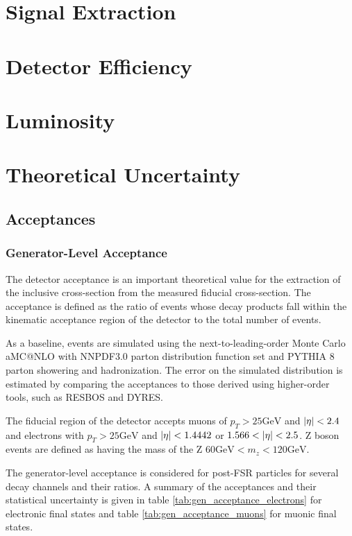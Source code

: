 \documentclass[aps,prd,final,twocolumn,letterpaper]{revtex4}
\begin{document}
	\section{Signal Extraction}
	\section{Detector Efficiency}
	\section{Luminosity}
	\section{Theoretical Uncertainty}
		\subsection{Acceptances}
			\subsubsection{Generator-Level Acceptance}
			The detector acceptance is an important theoretical value for the extraction of the inclusive cross-section from the measured fiducial cross-section. The acceptance is defined as the ratio of events whose decay products fall within the kinematic acceptance region of the detector to the total number of events.
			
			As a baseline, events are simulated using the next-to-leading-order Monte Carlo aMC@NLO with NNPDF3.0 parton distribution function set and PYTHIA 8 parton showering and hadronization. The error on the simulated distribution is estimated by comparing the acceptances to those derived using higher-order tools, such as RESBOS and DYRES.
			
			The fiducial region of the detector accepts muons of $p_{T} > 25\si{\giga\electronvolt}$ and $\abs{\eta} < 2.4$ and electrons with $p_{T} > 25\si{\giga\electronvolt}$ and $\abs{\eta} < 1.4442$ or $1.566 < \abs{\eta} < 2.5$. Z boson events are defined as having the mass of the Z $60\si{\giga\electronvolt} < m_{z} < 120\si{\giga\electronvolt}$.
			
			The generator-level acceptance is considered for post-FSR particles for several decay channels and their ratios. A summary of the acceptances and their statistical uncertainty is given in table \ref{tab:gen_acceptance_electrons} for electronic final states and table \ref{tab:gen_acceptance_muons} for muonic final states.
			
\end{document}
